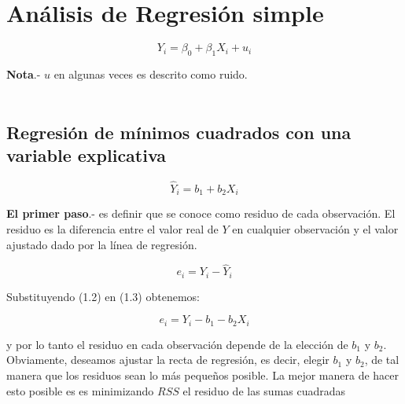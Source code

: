 \chapter{Análisis de Regresión simple}
\begin{multicols}{2}
\begin{tcolorbox}[colframe = white]
    \begin{equation}
	Y_i = \beta_0 + \beta_1 X_i + u_i 
    \end{equation}
\end{tcolorbox}

\textbf{Nota}.- $u$ en algunas veces es descrito como ruido.\\\\

\setcounter{section}{1}
\section{Regresión de mínimos cuadrados con una variable explicativa}
\begin{tcolorbox}[colframe = white]
    \begin{equation}
	\hat{Y}_i = b_1 + b_2 X_i 
    \end{equation}
\end{tcolorbox}
\textbf{El primer paso}.- es definir que se conoce como residuo de cada observación. El residuo es la diferencia entre el valor real de $Y$ en cualquier observación y el valor ajustado dado por la línea de regresión.

\begin{tcolorbox}[colframe = white]
    \begin{equation}
	e_i = Y_i - \hat{Y}_i
    \end{equation}
\end{tcolorbox}

Substituyendo (1.2) en (1.3) obtenemos:

\begin{tcolorbox}[colframe = white]
    \begin{equation}
	e_i = Y_i - b_1 - b_2 X_i
    \end{equation}
\end{tcolorbox}
y por lo tanto el residuo en cada observación depende de la elección de $b_1$ y $b_2$. Obviamente, deseamos ajustar la recta de regresión, es decir, elegir $b_1$ y $b_2$, de tal manera que los residuos sean lo más pequeños posible. La mejor manera de hacer esto posible es es minimizando $RSS$ el residuo de las sumas cuadradas 


\end{multicols}
